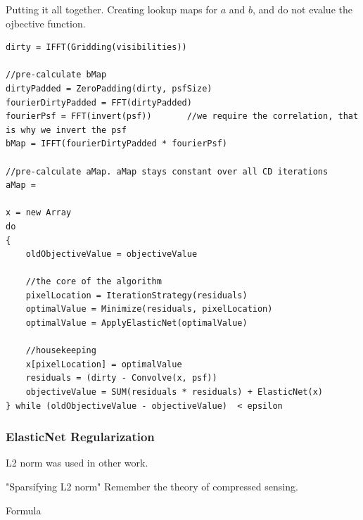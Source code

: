 Putting it all together. Creating lookup maps for $a$ and $b$, and do not evalue the ojbective function.
\begin{lstlisting}
dirty = IFFT(Gridding(visibilities))

//pre-calculate bMap
dirtyPadded = ZeroPadding(dirty, psfSize)
fourierDirtyPadded = FFT(dirtyPadded)
fourierPsf = FFT(invert(psf))		//we require the correlation, that is why we invert the psf
bMap = IFFT(fourierDirtyPadded * fourierPsf)

//pre-calculate aMap. aMap stays constant over all CD iterations
aMap = 
 
x = new Array   
do 
{
	oldObjectiveValue = objectiveValue
	
	//the core of the algorithm
	pixelLocation = IterationStrategy(residuals)
	optimalValue = Minimize(residuals, pixelLocation)
	optimalValue = ApplyElasticNet(optimalValue)
	
	//housekeeping
	x[pixelLocation] = optimalValue
	residuals = (dirty - Convolve(x, psf))
	objectiveValue = SUM(residuals * residuals) + ElasticNet(x)
} while (oldObjectiveValue - objectiveValue)  < epsilon
\end{lstlisting}



\subsubsection{ElasticNet Regularization} \label{dist:deconv:reg}
L2 norm was used in other work. \cite{ferrari2014distributed}

"Sparsifying L2 norm"
Remember the theory of compressed sensing.

Formula


